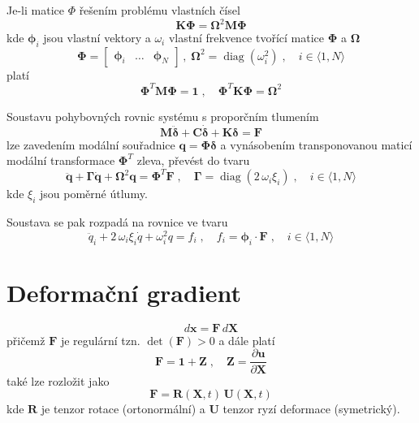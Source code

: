 \documentclass{article}
\begin{document}
	Je-li matice $\Phi$ řešením problému vlastních čísel
	\begin{equation}
		\bm{K}\bm{\Phi} = \bm{\Omega}^2 \bm{M} \bm{\Phi}
	\end{equation}
	kde $\bm{\phi}_i$ jsou vlastní vektory a $\omega_i$ vlastní frekvence tvořící matice $\bm{\Phi}$ a $\bm{\Omega}$  
	\begin{equation}
		\bm{\Phi} = \begin{bmatrix} \bm{\phi}_i & \dots & \bm{\phi}_N \end{bmatrix}
		\,,\;
		\bm{\Omega}^2 = \operatorname{diag}(\omega_i^2)
		\;,\quad 
		i \in \langle 1,N \rangle
	\end{equation}
	platí
	\begin{equation}
		\bm{\Phi}^T\bm{M}\bm{\Phi} = \bm{1}
		\;,\quad 
		\bm{\Phi}^T\bm{K}\bm{\Phi} = \bm{\Omega}^2
	\end{equation}

	Soustavu pohybovných rovnic systému s proporčním tlumením
	\begin{equation}
		\bm{M}\bm{\ddot{\delta}} + \bm{C}\bm{\dot{\delta}} + \bm{K}\bm{\delta} = \bm{F}
	\end{equation}
	lze zavedením modální souřadnice $\bm{q} = \bm{\Phi}\bm{\delta}$ a vynásobením transponovanou maticí modální transformace $\bm{\Phi}^T$ zleva, převést do tvaru
	\begin{equation}
		\bm{\ddot{q}} + \bm{\Gamma}\bm{\dot{q}} + \bm{\Omega}^2 \bm{q} = \bm{\Phi}^T \bm{F}
		\;,\quad 
		\bm{\Gamma} = \operatorname{diag}(2\,\omega_i\xi_i) \;,\quad i \in \langle 1,N \rangle
	\end{equation}
	kde $\xi_i$ jsou poměrné útlumy.

	Soustava se pak rozpadá na rovnice ve tvaru
	\begin{equation}
		\ddot{q}_i + 2\,\omega_i\xi_i \dot{q} + \omega_i^2 q = f_i
		\;,\quad 
		f_i = \bm{\phi}_i \cdot \bm{F}
		\;,\quad 
		i \in \langle 1,N \rangle
	\end{equation}

	\section{Deformační gradient}
	\begin{equation}
		d\bm{x} = \bm{F} \, d\bm{X}
	\end{equation}
	přičemž $\bm{F}$ je regulární tzn. $\det(\bm{F}) > 0$ a dále platí
	\begin{equation}
	\bm{F} = \bm{1} + \bm{Z}
	\;,\quad 
	\bm{Z} = \frac{\partial \bm{u}}{\partial \bm{X}}
	\end{equation}
	také lze rozložit jako
	\begin{equation}
	\bm{F} = \bm{R}(\bm{X},t)\,\bm{U}(\bm{X},t)
	\end{equation}
	kde $\bm{R}$ je tenzor rotace (ortonormální) a $\bm{U}$ tenzor ryzí deformace (symetrický).
	
\end{document}
